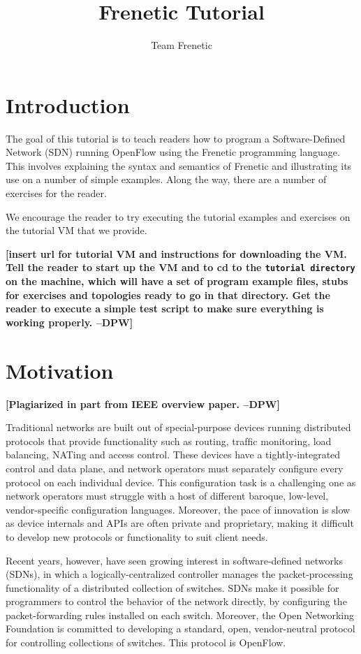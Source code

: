 \documentclass{article}
\title{Frenetic Tutorial}
\author{Team Frenetic}
\newcommand{\finish}[2][cornellred]{\ifdraft\textcolor{#1}{\textbf{[#2]}}\fi}
\newcommand{\dpw}[1]{\finish[cornellred]{#1 --DPW}}
\newcommand{\tutorialdir}{\texttt{tutorial directory}}
\begin{document}
\maketitle

\section{Introduction}

The goal of this tutorial is to teach readers how to program a
Software-Defined Network (SDN) running OpenFlow using the Frenetic
programming language.  This involves explaining the syntax and
semantics of Frenetic and illustrating its use on a number of simple
examples.  Along the way, there are a number of exercises for the
reader.  

We encourage the reader to try executing the tutorial examples and exercises
on the tutorial VM that we provide.

\dpw{insert url for tutorial VM and instructions for downloading the VM.  
Tell the reader to start up the VM and to cd to the \tutorialdir{} on the
machine, which will have a set of program example files, stubs for exercises
and topologies ready to go in that directory.  Get the reader to execute
a simple test script to make sure everything is working properly.}

\section{Motivation}

\dpw{Plagiarized in part from IEEE overview paper.}

Traditional networks are built out of special-purpose devices running
distributed protocols that provide functionality such as routing,
trafﬁc monitoring, load balancing, NATing and access control. These
devices have a tightly-integrated control and data plane, and network
operators must separately conﬁgure every protocol on each individual
device. This configuration task is a challenging one as network
operators must struggle with a host of different baroque, low-level,
vendor-specific configuration languages.  Moreover, the pace of
innovation is slow as device internals and APIs are often private and
proprietary, making it difficult to develop new protocols or
functionality to suit client needs.

Recent years, however, have seen growing interest in software-deﬁned
networks (SDNs), in which a logically-centralized controller manages
the packet-processing functionality of a distributed collection of
switches. SDNs make it possible for programmers to control the
behavior of the network directly, by conﬁguring the packet-forwarding
rules installed on each switch.  Moreover, the Open Networking
Foundation is committed to developing a standard, open, vendor-neutral
protocol for controlling collections of switches.  This protocol is
OpenFlow.
\end{document}
